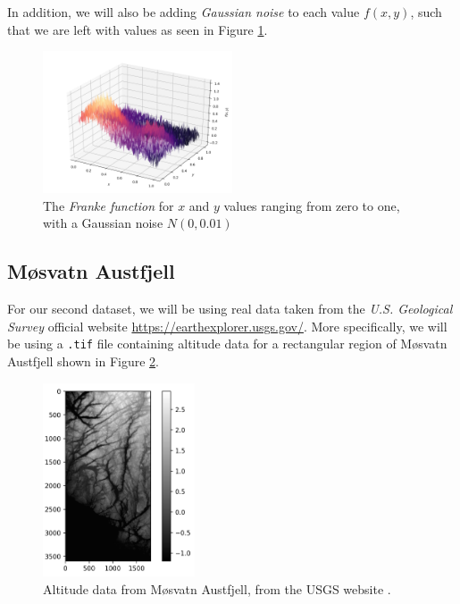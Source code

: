 \documentclass[a4paper,10pt,english]{article}
\begin{document}
In addition, we will also be adding \textit{Gaussian noise} to each value $f(x,y)$, such that we are left with values as seen in Figure \ref{fig_Franke_noise}.

\begin{figure}[H]
	\centering
	\includegraphics[width = 0.5\textwidth, center]{Franke_noise.png}
	\caption{The \textit{Franke function} for $x$ and $y$ values ranging from zero to one, with a Gaussian noise $N(0,0.01)$\label{fig_Franke_noise}}
\end{figure}

\subsection*{Møsvatn Austfjell}

For our second dataset, we will be using real data taken from the \textit{U.S. Geological Survey} \cite{earthexplorer} official website \url{https://earthexplorer.usgs.gov/}.  More specifically, we will be using a \texttt{.tif} file containing altitude data for a rectangular region of Møsvatn Austfjell shown in Figure \ref{fig_austfjell}.

\begin{figure}[H]
	\centering
	\includegraphics[width = 0.4\textwidth, center]{real_data.png}
	\caption{Altitude data from Møsvatn Austfjell, from the USGS website \cite{earthexplorer}.\label{fig_austfjell}}
\end{figure}	
\end{document}
